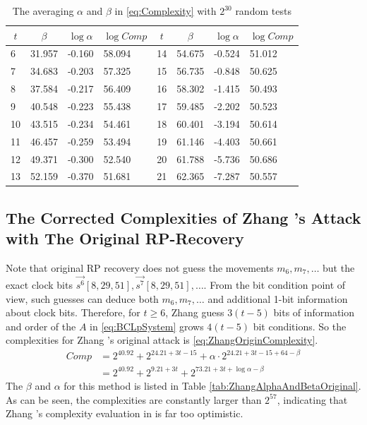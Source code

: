 \begin{table}[htbp]
  \centering
  \caption{The averaging $\alpha$ and $\beta$ in \eqref{eq:Complexity} with $2^{30}$ random tests}\label{tab:ZhangAlphaAndBeta}
    \begin{tabular}{|l|l|l|l|l|l|l|l|}
    \hline
    \multicolumn{1}{|c|}{$t$} & \multicolumn{1}{c|}{$\beta$} & \multicolumn{1}{c|}{$\log\alpha$} & \multicolumn{1}{c|}{$\log Comp$} & \multicolumn{1}{c|}{$t$} & \multicolumn{1}{c|}{$\beta$} & \multicolumn{1}{c|}{$\log\alpha$} & \multicolumn{1}{c|}{$\log Comp$} \\
    \hline

    6    & 31.957 & -0.160 & 58.094 & 14    & 54.675 & -0.524 &  51.012\\
    \hline
    7    & 34.683 & -0.203 & 57.325 & 15    & 56.735 & -0.848 &  50.625\\
    \hline
    8    & 37.584 & -0.217 & 56.409 & 16    & 58.302 & -1.415 &  50.493\\
    \hline
    9    &  40.548 & -0.223 & 55.438 & 17    & 59.485 & -2.202 &  50.523\\
    \hline
    10    & 43.515 & -0.234 & 54.461 & 18    & 60.401 & -3.194 &  50.614\\
    \hline
    11    & 46.457 & -0.259 & 53.494 & 19    & 61.146 & -4.403 &  50.661\\
    \hline
    12    & 49.371 & -0.300 & 52.540 & 20    & 61.788 & -5.736 &  50.686\\
    \hline
    13    & 52.159 & -0.370 & 51.681 & 21    & 62.365 & -7.287 &  50.557\\
    \hline
    \end{tabular}%
\end{table}%


\subsection{The Corrected Complexities of Zhang \etal's Attack with The Original RP-Recovery}\label{sec:ZhangRpRecovery}
Note that original RP recovery does not guess the movements $m_6,m_7,\ldots$ but the exact clock bits $\vec{s^6}[8,29,51], \vec{s^7}[8,29,51],\ldots$. 
From the bit condition point of view, such guesses can deduce both $m_6,m_7,\ldots$ and additional 1-bit information about clock bits. 
Therefore, for $t\geq 6$, Zhang \etal guess $3(t-5)$ bits of information and order of the $A$ in \eqref{eq:BCLpSystem} grows $4(t-5)$ bit conditions. 
So the complexities for Zhang \etal's original attack is \eqref{eq:ZhangOriginComplexity}. 
\begin{equation}\label{eq:ZhangOriginComplexity}
\begin{aligned}
Comp&=2^{40.92}+2^{24.21+3t-15}+\alpha \cdot 2^{24.21+3t-15+64-\beta}\\
&=2^{40.92}+2^{9.21+3t}+2^{73.21+3t+\log \alpha -\beta}
\end{aligned}
\end{equation}
The $\beta$ and $\alpha$ for this method is listed in Table \ref{tab:ZhangAlphaAndBetaOriginal}. 
As can be seen, the complexities are constantly larger than $2^{57}$, indicating that Zhang \etal's complexity evaluation in \cite{AC:Zhang19} is far too optimistic. 

